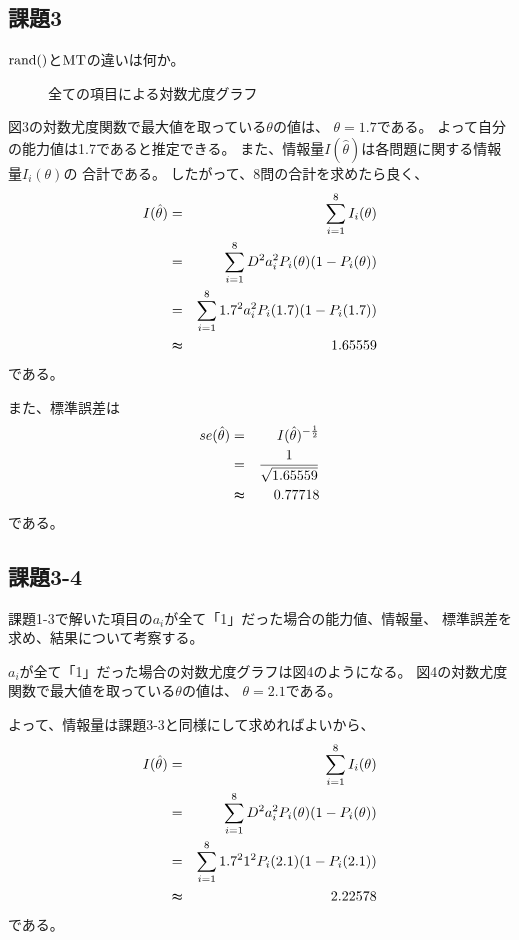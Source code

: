 \documentclass[12pt]{jarticle}
\begin{document}
\subsection{課題3}
\begin{shadebox}
    $\rm{rand()}$と$\rm{MT}$の違いは何か。
\end{shadebox}

\begin{figure}[h]
    \begin{center}
    \end{center}
    \caption{全ての項目による対数尤度グラフ}
\end{figure}
\clearpage


図3の対数尤度関数で最大値を取っている$\theta$の値は、
$\theta=1.7$である。
よって自分の能力値は1.7であると推定できる。
また、情報量$I(\hat{\theta})$は各問題に関する情報量$I_i({\theta})$の
合計である。
したがって、8問の合計を求めたら良く、
\begin{eqnarray*}
    I(\hat{\theta})&=&\sum_{i=1}^{8}{I_i({\theta})}\\
    &=&\sum_{i=1}^{8}{D^2a_i^2P_i(\theta)(1-P_i(\theta))}\\
    &=&\sum_{i=1}^{8}{1.7^2a_i^2P_i(1.7)(1-P_i(1.7))}\\
    &\thickapprox & 1.65559
\end{eqnarray*}
である。

また、標準誤差は
\begin{eqnarray*}
    se(\hat{\theta})&=&I(\hat{\theta})^{-\frac{1}{2}}\\
    &= &\frac{1}{\sqrt{ 1.65559}}\\
    &\thickapprox& 0.77718
\end{eqnarray*}
である。

\subsection{課題3-4}
\begin{shadebox}
    課題1-3で解いた項目の$a_i$が全て「1」だった場合の能力値、情報量、
    標準誤差を求め、結果について考察する。
\end{shadebox}



$a_i$が全て「1」だった場合の対数尤度グラフは図4のようになる。
図4の対数尤度関数で最大値を取っている$\theta$の値は、
$\theta=2.1$である。

よって、情報量は課題3-3と同様にして求めればよいから、
\begin{eqnarray*}
    I(\hat{\theta})&=&\sum_{i=1}^{8}{I_i({\theta})}\\
    &=&\sum_{i=1}^{8}{D^2a_i^2P_i(\theta)(1-P_i(\theta))}\\
    &=&\sum_{i=1}^{8}{1.7^2 1^2P_i(2.1)(1-P_i(2.1))}\\
    &\thickapprox & 2.22578
\end{eqnarray*}
である。
\end{document}
